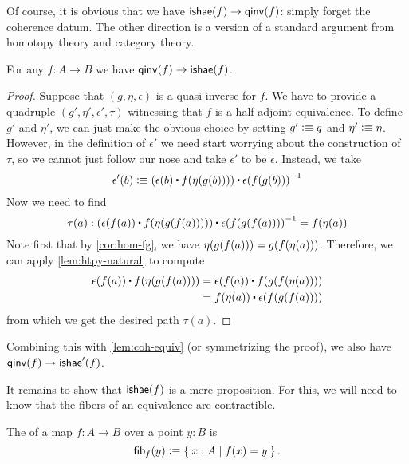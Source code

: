 Of course, it is obvious that we have $\mathsf{ishae}(f) \to\mathsf{qinv}(f)$: simply forget the coherence datum.
The other direction is a version of a standard argument from homotopy theory and category theory.

\begin{thm}\label{thm:equiv-iso-adj}
  For any $f:A\to B$ we have $\mathsf{qinv}(f)\to\mathsf{ishae}(f)$.
\end{thm}
\begin{proof}
Suppose that $(g,\eta,\epsilon)$ is a quasi-inverse for $f$. We have to provide
a quadruple $(g',\eta',\epsilon',\tau)$ witnessing that $f$ is a half adjoint equivalence. To
define $g'$ and $\eta'$, we can just make the obvious choice by setting $g'
\vcentcolon\equiv g$ and $\eta'\vcentcolon\equiv \eta$. However, in the definition of $\epsilon'$ we
need start worrying about the construction of $\tau$, so we cannot just follow our nose
and take $\epsilon'$ to be $\epsilon$. Instead, we take
\begin{equation*}
\epsilon'(b) \defeq (\epsilon(b)\ct \ap{f}{\eta(g(b))})\ct \opp{\epsilon(f(g(b)))}
\end{equation*}
Now we need to find
\begin{equation*}
\tau(a):(\epsilon(f(a))\ct \ap{f}{\eta(g(f(a)))})\ct \opp{\epsilon(f(g(f(a))))}=\ap{f}{\eta(a)}
\end{equation*}
Note first that by \autoref{cor:hom-fg}, we have 
$\eta(g(f(a)))={g}\mathopen{}\left({{f}\mathopen{}\left({\eta(a)}\right)\mathclose{}}\right)\mathclose{}$. Therefore, we can apply
\autoref{lem:htpy-natural} to compute
\begin{align*}
\epsilon(f(a))\ct \ap{f}{\eta(g(f(a)))}
& = \epsilon(f(a))\ct \ap{f}{\ap{g}{\ap{f}{\eta(a)}}}\\
& = \ap{f}{\eta(a)}\ct\epsilon(f(g(f(a))))
\end{align*}
from which we get the desired path $\tau(a)$.
\end{proof}

Combining this with \autoref{lem:coh-equiv} (or symmetrizing the proof), we also have $\mathsf{qinv}(f)\to\mathsf{ishae}'(f)$.

It remains to show that $\mathsf{ishae}(f)$ is a mere proposition.
For this, we will need to know that the fibers of an equivalence are contractible.

\begin{defn}\label{defn:homotopy-fiber}
  The 
  of a map $f:A\to B$ over a point $y:B$ is
  \[ {\mathsf{fib}}_{f}(y) \vcentcolon\equiv \Set{x:A | f(x) = y}.\]
\end{defn}


